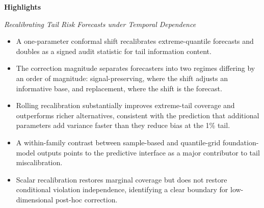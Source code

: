 \documentclass[11pt]{article}
\begin{document}
\begin{center}
\Large\bfseries Highlights
\end{center}

\bigskip

\noindent\textit{Recalibrating Tail Risk Forecasts under Temporal Dependence}

\bigskip

\begin{itemize}[leftmargin=*, itemsep=8pt]

\item A one-parameter conformal shift recalibrates extreme-quantile forecasts and doubles as a signed audit statistic for tail information content.

\item The correction magnitude separates forecasters into two regimes differing by an order of magnitude: signal-preserving, where the shift adjusts an informative base, and replacement, where the shift is the forecast.

\item Rolling recalibration substantially improves extreme-tail coverage and outperforms richer alternatives, consistent with the prediction that additional parameters add variance faster than they reduce bias at the 1\% tail.

\item A within-family contrast between sample-based and quantile-grid foundation-model outputs points to the predictive interface as a major contributor to tail miscalibration.

\item Scalar recalibration restores marginal coverage but does not restore conditional violation independence, identifying a clear boundary for low-dimensional post-hoc correction.

\end{itemize}
\end{document}
